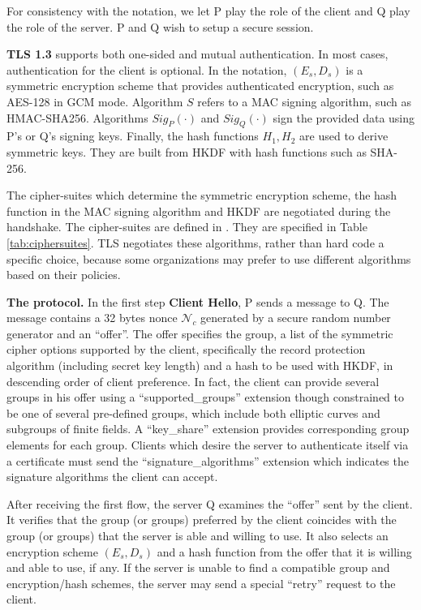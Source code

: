 For consistency with the notation, we let P play the role of the client and Q play the role of the server. P and Q wish to setup a secure session. 

\textbf{TLS 1.3} supports both one-sided and mutual authentication. In most cases, authentication for the client is optional. In the notation, $(E_s , D_s)$ is a symmetric encryption scheme that provides authenticated encryption, such as AES-128 in GCM mode.  Algorithm $S$ refers to a MAC signing algorithm, such as HMAC-SHA256. Algorithms $Sig_P(\cdot )$ and $Sig_Q(\cdot )$ sign the provided data using P's or Q's signing keys. Finally, the hash functions $H_1, H_2$ are used to derive symmetric keys. They are built from HKDF with hash functions such as SHA-256. 

The cipher-suites which determine the symmetric encryption scheme, the hash function in the MAC signing algorithm and HKDF are negotiated during the handshake. The cipher-suites are defined in \cite{rfc8446}. They are specified in Table \ref{tab:ciphersuites}. TLS negotiates these algorithms, rather than hard code a specific choice, because some organizations may prefer to use different algorithms based on their policies.

\textbf{The protocol.} In the first step \textbf{Client Hello}, P sends a message to Q. The message contains a 32 bytes nonce $\mathcal{N}_c$ generated by a secure random number generator and an ``offer''. The offer specifies the group, a list of the symmetric cipher options supported by the client, specifically the record protection algorithm (including secret key length) and a hash to be used with HKDF, in descending order of client preference. In fact, the client can provide several groups in his offer using a ``supported\_groups'' extension though constrained to be one of several pre-defined groups, which include both elliptic curves and subgroups of finite fields. A ``key\_share'' extension provides corresponding group elements for each group. Clients which desire the server to authenticate itself via a certificate must send the ``signature\_algorithms'' extension which indicates the signature algorithms the client can accept. 

After receiving the first flow, the server Q examines the ``offer'' sent by the client. It verifies that the group (or groups) preferred by the client coincides with the group (or groups) that the server is able and willing to use. It also selects an encryption scheme $(E_s , D_s)$ and a hash function
from the offer that it is willing and able to use, if any. If the server is unable to find a compatible group and encryption/hash schemes, the server may send a special ``retry'' request to the client.

